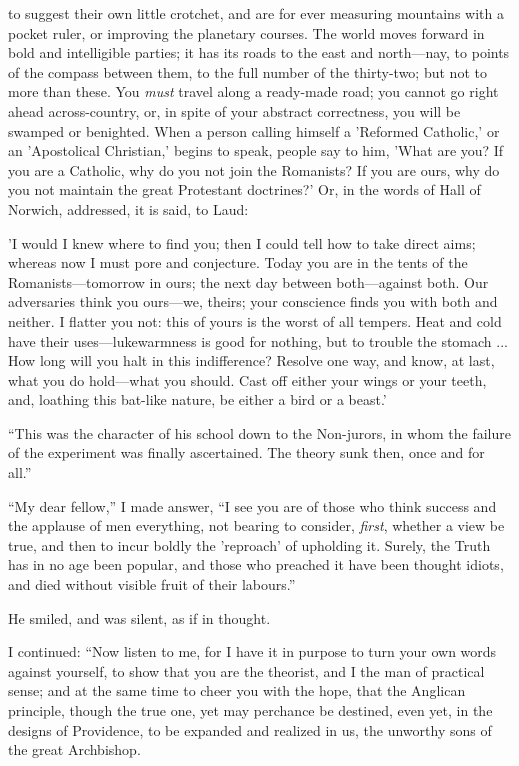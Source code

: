 to suggest their own little crotchet, and are for ever measuring
mountains with a pocket ruler, or improving the planetary courses. The
world moves forward in bold and intelligible parties; it has its roads
to the east and north—nay, to points of the compass between
them, to the full number of the thirty-two; but not to more than these.
You \emph{must} travel along a ready-made road; you cannot go right
ahead across-country, or, in spite of your abstract correctness, you
will be swamped or benighted. When a person calling himself a
'Reformed Catholic,' or an 'Apostolical Christian,' begins to speak,
people say to him, 'What are you? If you are a Catholic, why do you
not join the Romanists? If you are ours, why do you not maintain the
great Protestant doctrines?' Or, in the words of Hall of Norwich,
addressed, it is said, to Laud:

'I would I knew
where to find you; then I could tell how to take direct aims; whereas
now I must pore and conjecture. Today you are in the tents of the
Romanists—tomorrow in ours; the next day between both—against
both. Our adversaries think you ours—we, theirs; your conscience
finds you with both and neither. I flatter you not: this of yours is
the worst of all tempers. Heat and cold have their uses—lukewarmness
is good for nothing, but to trouble the stomach ... How long will you
halt in this indifference? Resolve one way, and know, at last, what
you do hold—what you should. Cast off either your wings or your
teeth, and, loathing this bat-like nature, be either a bird or a
beast.'

``This was the character of his school down to the
Non-jurors, in whom the failure of the experiment was finally
ascertained. The theory sunk then, once and for all.''

``My dear fellow,'' I made answer, ``I see you are
of those who think success and the applause of men everything, not
bearing to consider, \emph{first}, whether a view be true, and then to
incur boldly the 'reproach' of upholding it. Surely, the Truth has in
no age been popular, and those who preached it have been thought
idiots, and died without visible fruit of their labours.''

He smiled, and was silent, as if in thought.

I continued: ``Now listen to me, for I have it in
purpose to turn your own words against yourself, to show that you are
the theorist, and I the man of practical sense; and at the same time
to cheer you with the hope, that the Anglican principle, though the
true one, yet may perchance be destined, even yet, in the designs of
Providence, to be expanded and realized in us, the unworthy sons of
the great Archbishop.

